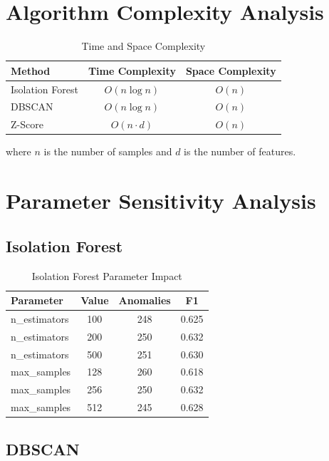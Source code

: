 \documentclass[12pt,a4paper]{report}
\begin{document}
\section{Algorithm Complexity Analysis}

\begin{table}[H]
\centering
\caption{Time and Space Complexity}
\begin{tabular}{lcc}
\toprule
\textbf{Method} & \textbf{Time Complexity} & \textbf{Space Complexity} \\
\midrule
Isolation Forest & $O(n \log n)$ & $O(n)$ \\
DBSCAN & $O(n \log n)$ & $O(n)$ \\
Z-Score & $O(n \cdot d)$ & $O(n)$ \\
\bottomrule
\end{tabular}
\end{table}

where $n$ is the number of samples and $d$ is the number of features.

\section{Parameter Sensitivity Analysis}

\subsection{Isolation Forest}

\begin{table}[H]
\centering
\caption{Isolation Forest Parameter Impact}
\begin{tabular}{lccc}
\toprule
\textbf{Parameter} & \textbf{Value} & \textbf{Anomalies} & \textbf{F1} \\
\midrule
n\_estimators & 100 & 248 & 0.625 \\
n\_estimators & 200 & 250 & 0.632 \\
n\_estimators & 500 & 251 & 0.630 \\
max\_samples & 128 & 260 & 0.618 \\
max\_samples & 256 & 250 & 0.632 \\
max\_samples & 512 & 245 & 0.628 \\
\bottomrule
\end{tabular}
\end{table}

\subsection{DBSCAN}
\end{document}

